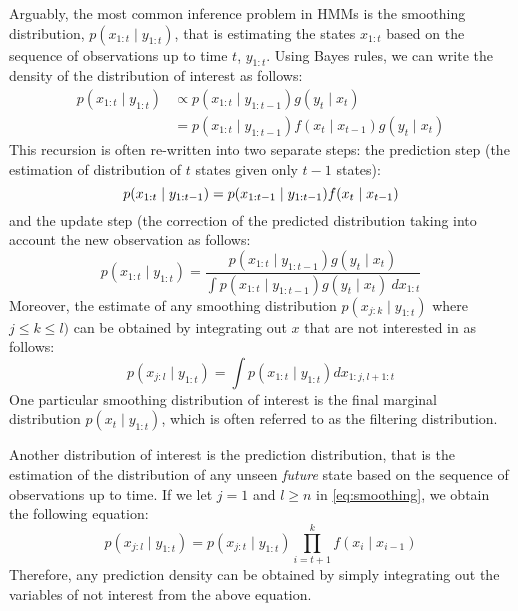 Arguably, the most common inference problem in HMMs is the smoothing distribution, $p(x_{1:t} \mid y_{1:t})$, that is estimating the states $x_{1:t}$ based on the sequence of observations up to time $t$, $y_{1:t}$. Using Bayes rules, we can write the density of the distribution of interest as follows:
\begin{align}
    p(x_{1:t} \mid y_{1:t}) &\propto p(x_{1:t} \mid y_{1:t-1}) g(y_t \mid x_t) \nonumber \\
                            &= p(x_{1:t} \mid y_{1:t-1})f(x_t \mid x_{t-1})g(y_t \mid x_t)
\end{align}
This recursion is often re-written into two separate steps: the prediction step (the estimation of distribution of $t$ states given only $t-1$ states):
\begin{equation}
  p(x_{1:t} \mid y_{1:t-1}) = p(x_{1:t-1} \mid y_{1:t-1})f(x_t \mid x_{t-1}) \nonumber \\
\end{equation}
and the update step (the correction of the predicted distribution taking into account the new observation as follows:
\begin{equation}
  p(x_{1:t} \mid y_{1:t}) = \dfrac{p(x_{1:t} \mid y_{1:t-1}) g(y_t \mid x_t)}{\int p(x_{1:t} \mid y_{1:t-1}) g(y_t \mid x_t)~dx_{1:t}}
\end{equation}
Moreover, the estimate of any smoothing distribution $p(x_{j:k} \mid y_{1:t})$ where $j \leq k \leq l)$ can be obtained by integrating out $x$ that are not interested in as follows:
\begin{equation}
  p(x_{j:l} \mid y_{1:t}) = \int p(x_{1:t} \mid y_{1:t}) dx_{1:j, l+1:t}
\label{eq:smoothing}
\end{equation}
One particular smoothing distribution of interest is the final marginal distribution $p(x_t \mid y_{1:t})$, which is often referred to as the filtering distribution.

Another distribution of interest is  the prediction distribution, that is the estimation of the distribution of any unseen \emph{future} state based on the sequence of observations up to time. If we let $j = 1$ and $l \geq n$ in \eqref{eq:smoothing}, we obtain the following equation:
\begin{equation}
  p(x_{j:l} \mid y_{1:t}) = p(x_{j:t} \mid y_{1:t}) \prod^k_{i=t+1} f(x_i \mid x_{i-1})
\end{equation}
Therefore, any prediction density can be obtained by simply integrating out the variables of not interest from the above equation.

